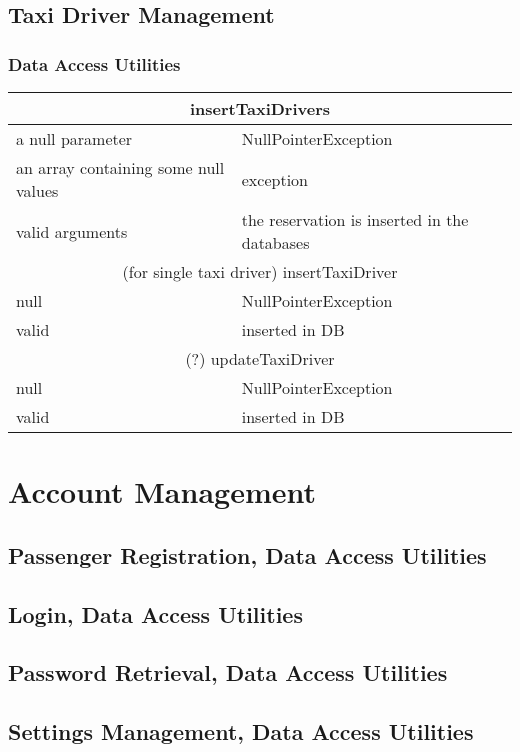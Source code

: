 \documentclass[11pt,oneside,a4paper]{report}
\begin{document}
\section{Taxi Driver Management}
\subsection{Data Access Utilities}
\begin{tabular}{p{5cm}|p{6cm}}
	\hline
	\multicolumn{2}{c}{insertTaxiDrivers}\\\hline
	a null parameter &
	NullPointerException \\\hline
	an array containing some null values &
	exception\\\hline
	valid arguments &
	the reservation is inserted in the databases \\\hline\hline
	
	\multicolumn{2}{c}{(for single taxi driver) insertTaxiDriver}\\\hline
	null &
	NullPointerException \\\hline
	valid &
	inserted in DB \\\hline\hline
	
	\multicolumn{2}{c}{(?) updateTaxiDriver}\\\hline
	null &
	NullPointerException \\\hline
	valid &
	inserted in DB \\\hline
\end{tabular}


\chapter{Account Management}
\section{Passenger Registration, Data Access Utilities}

\section{Login, Data Access Utilities}

\section{Password Retrieval, Data Access Utilities}

\section{Settings Management, Data Access Utilities}
\end{document}
